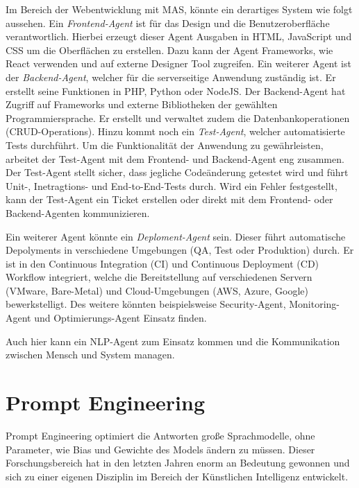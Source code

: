 Im Bereich der Webentwicklung mit MAS, könnte ein derartiges System wie folgt aussehen. Ein \textit{Frontend-Agent} ist für das Design und die Benutzeroberfläche verantwortlich. Hierbei erzeugt dieser Agent Ausgaben in HTML, JavaScript und CSS um die Oberflächen zu erstellen. Dazu kann der Agent Frameworks, wie React verwenden und auf externe Designer Tool zugreifen. Ein weiterer Agent ist der \textit{Backend-Agent}, welcher für die serverseitige Anwendung zuständig ist. Er erstellt seine Funktionen in PHP, Python oder NodeJS. Der Backend-Agent hat Zugriff auf Frameworks und externe Bibliotheken der gewählten Programmiersprache. Er erstellt und verwaltet zudem die Datenbankoperationen (CRUD-Operations). Hinzu kommt noch ein \textit{Test-Agent}, welcher automatisierte Tests durchführt. Um die Funktionalität der Anwendung zu gewährleisten, arbeitet der Test-Agent mit dem Frontend- und Backend-Agent eng zusammen. Der Test-Agent stellt sicher, dass jegliche Codeänderung getestet wird und führt Unit-, Inetragtions- und End-to-End-Tests durch. Wird ein Fehler festgestellt, kann der Test-Agent ein Ticket erstellen oder direkt mit dem Frontend- oder Backend-Agenten kommunizieren.\vspace{0.2cm}

Ein weiterer Agent könnte ein \textit{Deploment-Agent} sein. Dieser führt automatische Depolyments in verschiedene Umgebungen (QA, Test oder Produktion) durch. Er ist in den Continuous Integration (CI) und Continuous Deployment (CD) Workflow integriert, welche die Bereitstellung auf verschiedenen Servern (VMware, Bare-Metal) und Cloud-Umgebungen (AWS, Azure, Google) bewerkstelligt. Des weitere könnten beispielsweise Security-Agent, Monitoring-Agent und Optimierungs-Agent Einsatz finden.\vspace{0.2cm}

Auch hier kann ein NLP-Agent zum Einsatz kommen und die Kommunikation zwischen Mensch und System managen.




\section{Prompt Engineering}
Prompt Engineering optimiert die Antworten große Sprachmodelle, ohne Parameter, wie Bias und Gewichte des Models ändern zu müssen. Dieser Forschungsbereich hat in den letzten Jahren enorm an Bedeutung gewonnen und sich zu einer eigenen Disziplin im Bereich der Künstlichen Intelligenz entwickelt.\vspace{0.2cm}


